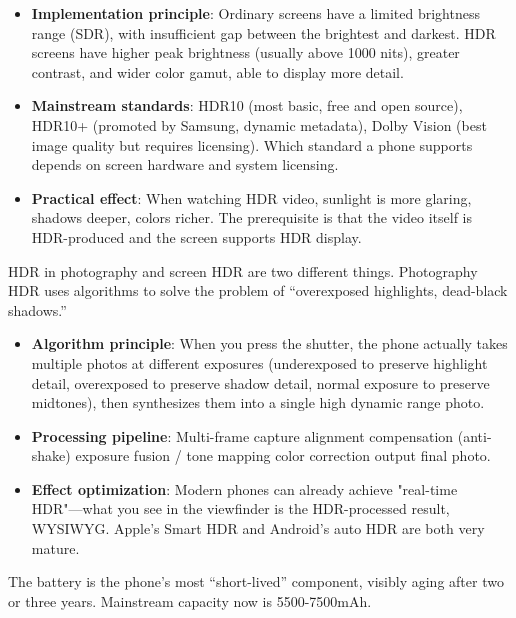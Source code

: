 \begin{itemize}
  \item \textbf{Implementation principle}: Ordinary screens have a limited brightness range (SDR), with insufficient gap between the brightest and darkest. HDR screens have higher peak brightness (usually above 1000 nits), greater contrast, and wider color gamut, able to display more detail.
  \item \textbf{Mainstream standards}: HDR10 (most basic, free and open source), HDR10+ (promoted by Samsung, dynamic metadata), Dolby Vision (best image quality but requires licensing). Which standard a phone supports depends on screen hardware and system licensing.
  \item \textbf{Practical effect}: When watching HDR video, sunlight is more glaring, shadows deeper, colors richer. The prerequisite is that the video itself is HDR-produced and the screen supports HDR display.
\end{itemize}


HDR in photography and screen HDR are two different things. Photography HDR uses algorithms to solve the problem of “overexposed highlights, dead-black shadows.”

\begin{itemize}
  \item \textbf{Algorithm principle}: When you press the shutter, the phone actually takes multiple photos at different exposures (underexposed to preserve highlight detail, overexposed to preserve shadow detail, normal exposure to preserve midtones), then synthesizes them into a single high dynamic range photo.
  \item \textbf{Processing pipeline}: Multi-frame capture alignment compensation (anti-shake) exposure fusion / tone mapping color correction output final photo.
  \item \textbf{Effect optimization}: Modern phones can already achieve "real-time HDR"—what you see in the viewfinder is the HDR-processed result, WYSIWYG. Apple's Smart HDR and Android's auto HDR are both very mature.
\end{itemize}


The battery is the phone's most “short-lived” component, visibly aging after two or three years. Mainstream capacity now is 5500-7500mAh.

